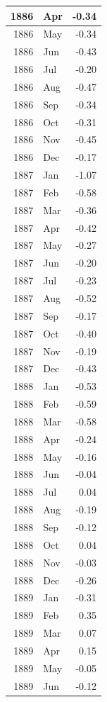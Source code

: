 \documentclass[
]{article}
\begin{document}
\begin{table}[H]
\begin{tabular}[t]{r|l|r}
\hline
1886 & Apr & -0.34\\
\hline
1886 & May & -0.34\\
\hline
1886 & Jun & -0.43\\
\hline
1886 & Jul & -0.20\\
\hline
1886 & Aug & -0.47\\
\hline
1886 & Sep & -0.34\\
\hline
1886 & Oct & -0.31\\
\hline
1886 & Nov & -0.45\\
\hline
1886 & Dec & -0.17\\
\hline
1887 & Jan & -1.07\\
\hline
1887 & Feb & -0.58\\
\hline
1887 & Mar & -0.36\\
\hline
1887 & Apr & -0.42\\
\hline
1887 & May & -0.27\\
\hline
1887 & Jun & -0.20\\
\hline
1887 & Jul & -0.23\\
\hline
1887 & Aug & -0.52\\
\hline
1887 & Sep & -0.17\\
\hline
1887 & Oct & -0.40\\
\hline
1887 & Nov & -0.19\\
\hline
1887 & Dec & -0.43\\
\hline
1888 & Jan & -0.53\\
\hline
1888 & Feb & -0.59\\
\hline
1888 & Mar & -0.58\\
\hline
1888 & Apr & -0.24\\
\hline
1888 & May & -0.16\\
\hline
1888 & Jun & -0.04\\
\hline
1888 & Jul & 0.04\\
\hline
1888 & Aug & -0.19\\
\hline
1888 & Sep & -0.12\\
\hline
1888 & Oct & 0.04\\
\hline
1888 & Nov & -0.03\\
\hline
1888 & Dec & -0.26\\
\hline
1889 & Jan & -0.31\\
\hline
1889 & Feb & 0.35\\
\hline
1889 & Mar & 0.07\\
\hline
1889 & Apr & 0.15\\
\hline
1889 & May & -0.05\\
\hline
1889 & Jun & -0.12\\

\end{tabular}
\end{table}
\end{document}
